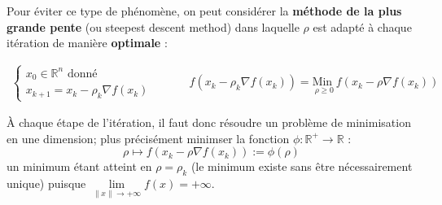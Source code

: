 \documentclass[a4paper,11pt]{article}
\newcommand{\R}{\mathbb{R}}
\newcommand{\norm}[1]{\left\lVert#1\right\rVert}
\newcommand{\deffonc}[3]{#1 : #2 \longrightarrow #3}
\newcommand{\MinI}[1]{\underset{#1}{\text{Min }}}
\theoremstyle{plain} %
\begin{document}
Pour éviter ce type de phénomène, on peut considérer la \textbf{méthode de la
plus grande pente} (ou steepest descent method) dans laquelle $\rho$ est adapté
à chaque itération de manière \textbf{optimale} :

\[
    \begin{array}{cc}
        \left\lbrace
        \begin{array}{c}
            x_0 \in \R^n \text{ donné} \\[5pt]
            x_{k+1} = x_k - \rho_k \nabla f (x_k)
        \end{array}
        \right.
        & \hspace{1cm}
        f\left(x_k - \rho_k \nabla f(x_k)\right) = \MinI{\rho \geq 0} f \left(x_k - \rho \nabla f(x_k) \right)
    \end{array}
\]

À chaque étape de l'itération, il faut donc résoudre un problème de minimisation
en une dimension; plus précisément minimser la fonction $\deffonc{\phi}{\R^+}{\R}$ :
\[
    \rho \mapsto f(x_k - \rho \nabla f(x_k) ) := \phi (\rho)
\]
un minimum étant atteint en $\rho = \rho_k$ (le minimum existe sans être
nécessairement unique) puisque $\underset{\norm{x} \to +\infty}{\lim} f(x) = +\infty$.
\end{document}
